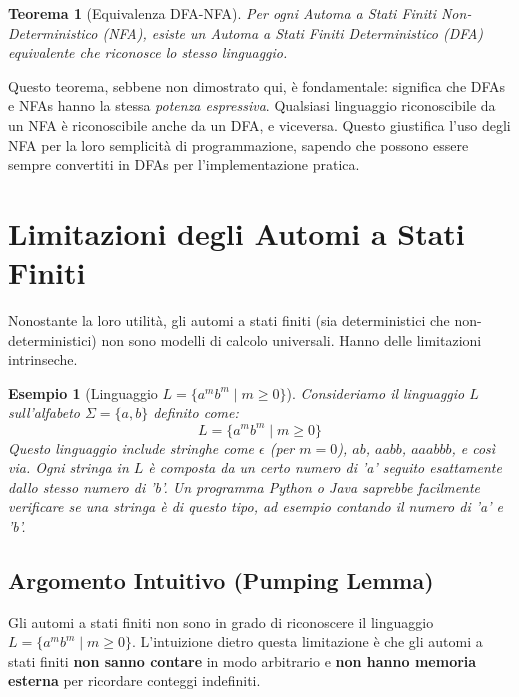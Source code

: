 \documentclass[a4paper]{article}
\newtheorem{theorem}{Teorema}[section]
\newtheorem{example}{Esempio}[section]
\begin{document}
\begin{theorem}[Equivalenza DFA-NFA]
Per ogni Automa a Stati Finiti Non-Deterministico (NFA), esiste un Automa a Stati Finiti Deterministico (DFA) equivalente che riconosce lo stesso linguaggio.
\end{theorem}
Questo teorema, sebbene non dimostrato qui, è fondamentale: significa che DFAs e NFAs hanno la stessa \emph{potenza espressiva}. Qualsiasi linguaggio riconoscibile da un NFA è riconoscibile anche da un DFA, e viceversa. Questo giustifica l'uso degli NFA per la loro semplicità di programmazione, sapendo che possono essere sempre convertiti in DFAs per l'implementazione pratica.

\section{Limitazioni degli Automi a Stati Finiti}
Nonostante la loro utilità, gli automi a stati finiti (sia deterministici che non-deterministici) non sono modelli di calcolo universali. Hanno delle limitazioni intrinseche.

\begin{example}[Linguaggio $L = \{a^m b^m \mid m \geq 0\}$]
Consideriamo il linguaggio $L$ sull'alfabeto $\Sigma = \{a, b\}$ definito come:
\[ L = \{a^m b^m \mid m \geq 0\} \]
Questo linguaggio include stringhe come $\epsilon$ (per $m=0$), $ab$, $aabb$, $aaabbb$, e così via. Ogni stringa in $L$ è composta da un certo numero di 'a' seguito esattamente dallo stesso numero di 'b'.
Un programma Python o Java saprebbe facilmente verificare se una stringa è di questo tipo, ad esempio contando il numero di 'a' e 'b'.
\end{example}

\subsection{Argomento Intuitivo (Pumping Lemma)}
Gli automi a stati finiti non sono in grado di riconoscere il linguaggio $L = \{a^m b^m \mid m \geq 0\}$. L'intuizione dietro questa limitazione è che gli automi a stati finiti \textbf{non sanno contare} in modo arbitrario e \textbf{non hanno memoria esterna} per ricordare conteggi indefiniti.
\end{document}
